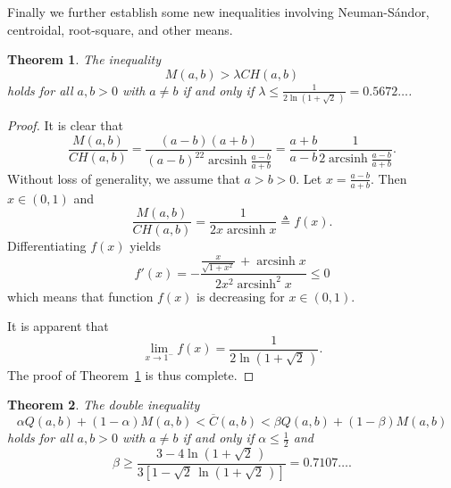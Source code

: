 \documentclass[reqno,a4paper]{amsart}
\numberwithin{equation}{section}
\theoremstyle{plain}
\newtheorem{thm}{Theorem}[section]
\theoremstyle{remark}
\begin{document}
Finally we further establish some new inequalities involving Neuman-S\'andor, centroidal, root-square, and other means.

\begin{thm}\label{thm3.2}
The inequality
\begin{equation}
M(a,b)>\lambda CH(a,b)
\end{equation}
holds for all $a,b>0$ with $a\ne b$ if and only if $\lambda\le\frac1{2\ln(1+\sqrt2\,)}=0.5672\dotsc$.
\end{thm}

\begin{proof}
It is clear that
\begin{equation*}
\frac{M(a,b)}{CH(a,b)}=\frac{(a-b)(a+b)}{(a-b)^22\operatorname{arcsinh}\frac{a-b}{a+b}}
=\frac{a+b}{a-b}\frac1{2\operatorname{arcsinh}\frac{a-b}{a+b}}.
\end{equation*}
Without loss of generality, we assume that $a>b>0$. Let $x=\frac{a-b}{a+b}$. Then $x\in(0,1)$ and
\begin{equation*}
\frac{M(a,b)}{CH(a,b)}=\frac1{2x\operatorname{arcsinh} x}\triangleq f(x).
\end{equation*}
Differentiating $f(x)$ yields
\begin{equation*}
f'(x)=-\frac{\frac{x}{\sqrt{1+x^2}}\,+\operatorname{arcsinh} x}{2x^2\operatorname{arcsinh}^2 x}\le0
\end{equation*}
which means that function $f(x)$ is decreasing for $x\in(0,1)$.
\par
It is apparent that
\begin{equation*}
\lim_{x\to1^-}f(x)=\frac1{2\ln(1+\sqrt2\,)}.
\end{equation*}
The proof of Theorem~\ref{thm3.2} is thus complete.
\end{proof}

\begin{thm}\label{thm3.3}
The double inequality
\begin{equation}
\alpha Q(a,b)+(1-\alpha)M(a,b)<\overline{C}(a,b)<\beta Q(a,b)+(1-\beta)M(a,b)
\end{equation}
holds for all $a,b>0$ with $a\ne b$ if and only if $\alpha\le\frac12$ and
\begin{equation*}
\beta\ge\frac{3-4\ln(1+\sqrt2\,)}{3[1-\sqrt2\,\ln(1+\sqrt2\,)]}=0.7107\dotsc.
\end{equation*}
\end{thm}
\end{document}
